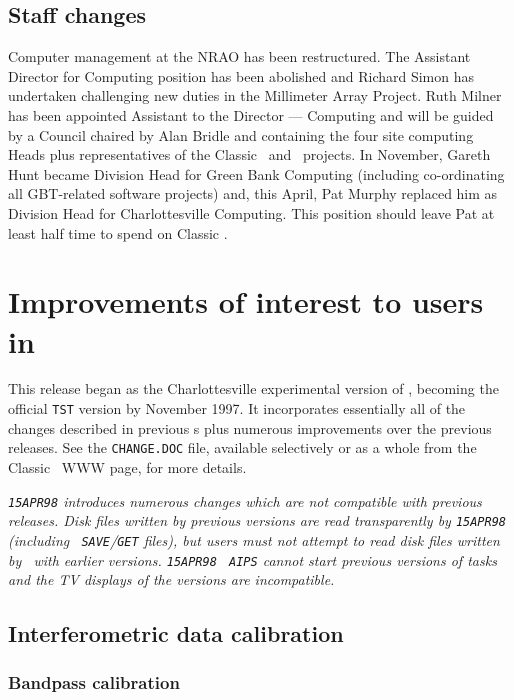 \subsection{Staff changes}

Computer management at the NRAO has been restructured.  The Assistant
Director for Computing position has been abolished and Richard Simon
has undertaken challenging new duties in the Millimeter Array
Project.  Ruth Milner has been appointed Assistant to the Director ---
Computing and will be guided by a Council chaired by Alan Bridle and
containing the four site computing Heads plus representatives of the
Classic \AIPS\ and \AIPTOO\ projects.  In November, Gareth Hunt became
Division Head for Green Bank Computing (including co-ordinating all
GBT-related software projects) and, this April, Pat Murphy replaced
him as Division Head for Charlottesville Computing.  This position
should leave Pat at least half time to spend on Classic \hbox{\AIPS}.

\vfill\eject
\section{Improvements of interest to users in \RELEASENAME}

This release began as the Charlottesville experimental version of
\AIPS, becoming the official {\tt TST} version by November 1997.
It incorporates essentially all of the changes described in
previous \Aipsletter s plus numerous improvements over the previous
releases.  See the \texttt{CHANGE.DOC} file, available selectively or
as a whole from the Classic \AIPS\ WWW page, for more details.

\emph{{\tt 15APR98} introduces numerous changes which are not
compatible with previous releases.  Disk files written by previous
versions are read transparently by {\tt 15APR98} (including {\tt
SAVE}/{\tt GET} files), but users must not attempt to read disk files
written by \RELEASENAME\ with earlier versions.  {\tt 15APR98} {\tt
AIPS} cannot start previous versions of tasks and the TV displays of
the versions are incompatible.}

\subsection{Interferometric data calibration}

\subsubsection{Bandpass calibration}

